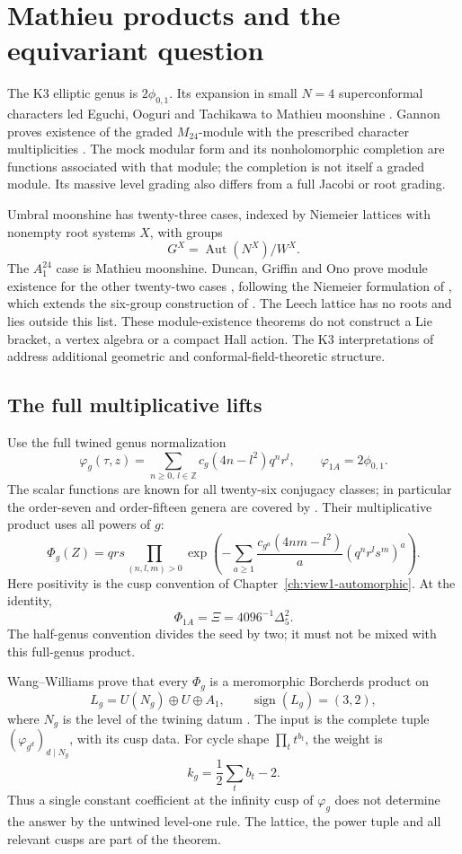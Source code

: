 \section{Mathieu products and the equivariant question}
\label{subsec:moonshine-adjacency}

The K3 elliptic genus is \(2\phi_{0,1}\). Its expansion in
small \(N=4\) superconformal characters led Eguchi, Ooguri and
Tachikawa to Mathieu moonshine \cite{EOT}. Gannon proves existence
of the graded \(M_{24}\)-module with the prescribed character
multiplicities \cite{GannonUmbral}. The mock modular form and its
nonholomorphic completion are functions associated with that
module; the completion is not itself a graded module. Its massive
level grading also differs from a full Jacobi or root grading.

Umbral moonshine has twenty-three cases, indexed by Niemeier
lattices with nonempty root systems \(X\), with groups
\[
 G^X=\operatorname{Aut}(N^X)/W^X.
\]
The \(A_1^{24}\) case is Mathieu moonshine. Duncan, Griffin and
Ono prove module existence for the other twenty-two cases
\cite{DuncanGriffinOnoUmbral}, following the Niemeier formulation
of \cite{CDHNiemeier}, which extends the six-group construction
of \cite{CDH}. The Leech lattice has no roots and lies outside
this list. These module-existence theorems do not construct a
Lie bracket, a vertex algebra or a compact Hall action. The K3
interpretations of \cite{GHV,ChengHarrison} address additional
geometric and conformal-field-theoretic structure.

\subsection{The full multiplicative lifts}

Use the full twined genus normalization
\[
 \varphi_g(\tau,z)
   =\sum_{n\ge0,\,l\in\mathbb Z}c_g(4n-l^2)q^n r^l,
 \qquad \varphi_{1A}=2\phi_{0,1}.
\]
The scalar functions are known for all twenty-six conjugacy
classes; in particular the order-seven and order-fifteen genera
are covered by \cite{GHVAllTwining}. Their multiplicative product
uses all powers of \(g\):
\[
 \Phi_g(Z)=qrs
 \prod_{(n,l,m)>0}
 \exp\left(-\sum_{a\ge1}
   \frac{c_{g^a}(4nm-l^2)}{a}(q^nr^ls^m)^a\right).
\]
Here positivity is the cusp convention of
Chapter~\ref{ch:view1-automorphic}. At the identity,
\[
 \Phi_{1A}=\Xi=4096^{-1}\Delta_5^2.
\]
The half-genus convention divides the seed by two; it must not be
mixed with this full-genus product.

Wang--Williams prove that every \(\Phi_g\) is a meromorphic
Borcherds product on
\[
 L_g=U(N_g)\oplus U\oplus A_1,
 \qquad \operatorname{sign}(L_g)=(3,2),
\]
where \(N_g\) is the level of the twining datum
\cite[Theorem~1.3]{WangWilliamsMathieu}. The input is the complete
tuple \((\varphi_{g^d})_{d\mid N_g}\), with its cusp data.
For cycle shape \(\prod_t t^{b_t}\), the weight is
\[
 k_g=\frac12\sum_t b_t-2.
\]
Thus a single constant coefficient at the infinity cusp of
\(\varphi_g\) does not determine the answer by the untwined
level-one rule. The lattice, the power tuple and all relevant
cusps are part of the theorem.

